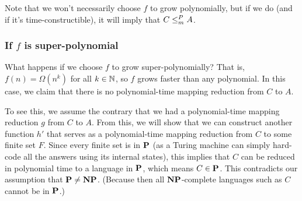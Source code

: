 Note that we won't necessarily choose $f$ to grow polynomially, but if we do (and if it's time-constructible), it will imply that $C \leq_m^P A$.

\subsubsection{If $f$ is super-polynomial}
What happens if we choose $f$ to grow super-polynomially? That is, $f(n) = \Omega(n^k)$ for all $k \in \mathbb N$, so $f$ grows faster than any polynomial. In this case, we claim that there is no polynomial-time mapping reduction from $C$ to $A$.

\begin{proofidea}
  To see this, we assume the contrary that we had a polynomial-time mapping reduction $g$ from $C$ to $A$. From this, we will show that we can construct another function $h'$ that serves as a polynomial-time mapping reduction from $C$ to some finite set $F$. Since every finite set is in $\textbf{P}$ (as a Turing machine can simply hard-code all the answers using its internal states), this implies that $C$ can be reduced in polynomial time to a language in $\textbf{P}$, which means $C \in \textbf{P}$. This contradicts our assumption that $\textbf{P} \neq \textbf{NP}$. (Because then all $\textbf{NP}$-complete languages such as $C$ cannot be in $\textbf{P}$.)
\end{proofidea}

